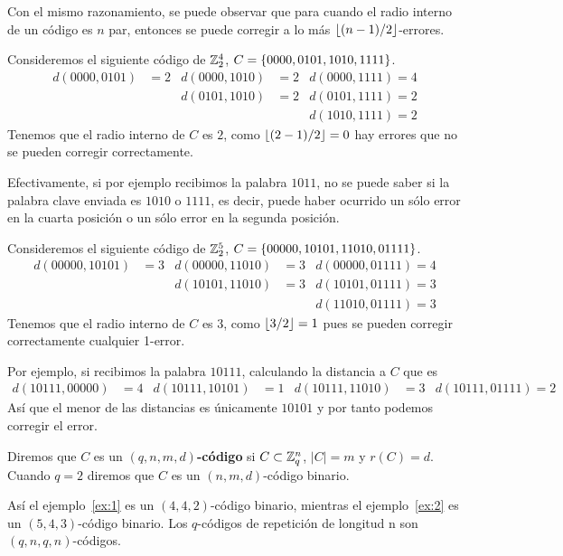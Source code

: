Con el mismo razonamiento, se puede observar que para cuando el radio interno de un código es $n$ par, entonces se puede corregir a lo más $\lfloor (n-1)/2 \rfloor$-errores.
\begin{example}
	\label{ex:1}
	Consideremos el siguiente código de $\mathbb{Z}_2^4$, $C=\left\{0000, 0101, 1010, 1111\right\}$.
	\begin{align*}
		d(0000, 0101) &= 2 & d(0000, 1010) &= 2 & d(0000, 1111) = 4 \\
		& & d(0101, 1010) &= 2 & d(0101, 1111) = 2 \\
		& & & & d(1010, 1111) = 2
	\end{align*}
	Tenemos que el radio interno de $C$ es $2$, como $\lfloor (2-1)/2 \rfloor=0$ hay errores que no se pueden corregir correctamente.

	Efectivamente, si por ejemplo recibimos la palabra $1011$, no se puede saber si la palabra clave enviada es $1010$ o $1111$, es decir, puede haber ocurrido un sólo error en la cuarta posición o un sólo error en la segunda posición.
\end{example}

\begin{example}
	\label{ex:2}
	Consideremos el siguiente código de $\mathbb{Z}_2^5$, $C=\left\{00000, 10101, 11010, 01111\right\}$.
	\begin{align*}
		d(00000, 10101) &= 3 & d(00000, 11010) &= 3 & d(00000, 01111) = 4 \\
		& & d(10101, 11010) &= 3 & d(10101, 01111) = 3 \\
		& & & & d(11010, 01111) = 3
	\end{align*}
	Tenemos que el radio interno de $C$ es $3$, como $\lfloor 3/2 \rfloor=1$ pues se pueden corregir correctamente cualquier 1-error.

	Por ejemplo, si recibimos la palabra $10111$, calculando la distancia a $C$ que es
	\begin{align*}
		d(10111, 00000) &= 4 & d(10111, 10101) &= 1 & d(10111, 11010) &= 3 & d(10111, 01111) = 2
	\end{align*}
	Así que el menor de las distancias es únicamente $10101$ y por tanto podemos corregir el error.
\end{example}

\begin{definition}
	Diremos que $C$ es un \textbf{$(q, n, m, d)$-código} si $C\subset\mathbb{Z}_q^n$, $|C| = m$ y $r(C)=d$.
	Cuando $q=2$ diremos que $C$ es un $(n, m, d)$-código binario.
\end{definition}

Así el ejemplo~\ref{ex:1} es un $(4, 4, 2)$-código binario, mientras el ejemplo~\ref{ex:2} es un $(5, 4, 3)$-código binario.
Los $q$-códigos de repetición de longitud n son $(q, n, q, n)$-códigos.